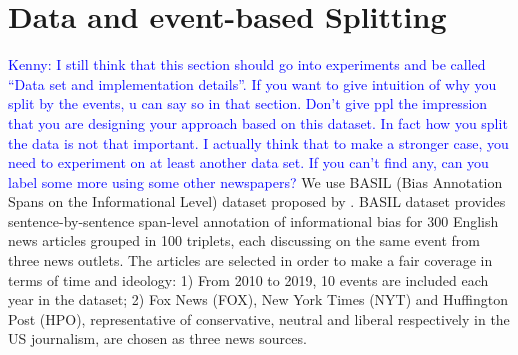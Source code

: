 \documentclass[letterpaper]{article} %
\newcommand{\KZ}[1]{\textcolor{blue}{Kenny: #1}}
\begin{document}






















\section{Data and event-based Splitting}
\KZ{I still think that this section should go into experiments and 
be called ``Data set and implementation details''. If you want to give intuition
of why you split by the events, u can say so in that section. Don't give ppl
the impression that you are designing your approach based on this dataset.
In fact how you split the data is not that important. I actually think that to
make a stronger case, you need to experiment on at least another data set.
If you can't find any, can you label some more using some other newspapers?}
 We use BASIL (Bias Annotation Spans on the
 Informational Level) dataset proposed by \citet{fan-etal-2019-plain}. BASIL dataset provides sentence-by-sentence span-level annotation of informational bias for 300 English news articles grouped in 100 triplets, each discussing on the same event from three news outlets. The articles are selected in order to make a fair coverage in terms of time and ideology: 1) From 2010 to 2019, 10 events are included each year in the dataset; 2) Fox News (FOX), New York Times (NYT) and Huffington Post (HPO), representative of conservative, neutral and liberal respectively in the US journalism, are chosen as three news sources.
\end{document}
